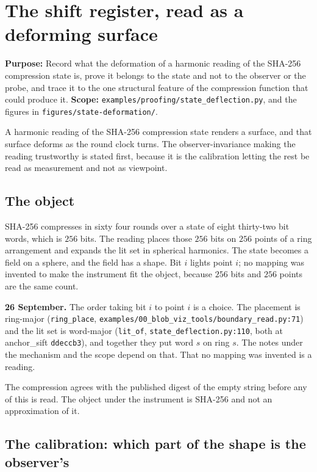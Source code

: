 \chapter{The shift register, read as a deforming surface}

\textbf{Purpose:} Record what the deformation of a harmonic reading of the SHA-256 compression state is, prove it belongs to the state and not to the observer or the probe, and trace it to the one structural feature of the compression function that could produce it. \textbf{Scope:} \texttt{examples/\allowbreak{}proofing/\allowbreak{}state\_deflection.py}, and the figures in \texttt{figures/\allowbreak{}state-deformation/}.

A harmonic reading of the SHA-256 compression state renders a surface, and that surface deforms as the round clock turns. The observer-invariance making the reading trustworthy is stated first, because it is the calibration letting the rest be read as measurement and not as viewpoint.

\section{The object}

SHA-256 compresses in sixty four rounds over a state of eight thirty-two bit words, which is \(256\) bits. The reading places those \(256\) bits on \(256\) points of a ring arrangement and expands the lit set in spherical harmonics. The state becomes a field on a sphere, and the field has a shape. Bit \(i\) lights point \(i\); no mapping was invented to make the instrument fit the object, because \(256\) bits and \(256\) points are the same count.

\textbf{26 September.} The order taking bit \(i\) to point \(i\) is a choice. The placement is ring-major (\texttt{ring\_place}, \texttt{examples/\allowbreak{}00\_blob\_viz\_tools/\allowbreak{}boundary\_read.py:71}) and the lit set is word-major (\texttt{lit\_of}, \texttt{state\_deflection.py:110}, both at anchor\_sift \texttt{ddeccb3}), and together they put word \(s\) on ring \(s\). The notes under the mechanism and the scope depend on that. That no mapping was invented is a reading.

The compression agrees with the published digest of the empty string before any of this is read. The object under the instrument is SHA-256 and not an approximation of it.

\section{The calibration: which part of the shape is the observer's}

